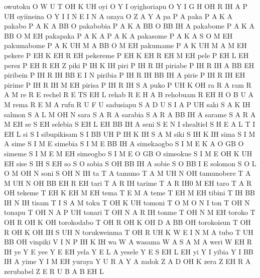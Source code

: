   owutoku O W U T OH K UH
  oyi O Y I
  oyighoriapu O Y I G H OH R IH A P UH
  oyiineina O Y I I N E I N A
  ozaya O Z A Y A
  pa P A
  paka P A K A
  pakabo P A K A BB O
  pakabobia P A K A BB O BB IH A
  pakabome P A K A BB O M EH
  pakapaka P A K A P A K A
  pakasome P A K A S O M EH
  pakumabome P A K UH M A BB O M EH
  pakumame P A K UH M A M EH
  pekere P EH K EH R EH
  pekereme P EH K EH R EH M EH
  pele P EH L EH
  perez P EH R EH Z
  piki P IH K IH
  piri P IH R IH
  piriabe P IH R IH A BB EH
  piribein P IH R IH BB E I N
  piribia P IH R IH BB IH A
  pirie P IH R IH EH
  pirime P IH R IH M EH
  pirisa P IH R IH S A
  puko P UH K OH
  ra R A
  ram R A M
  re R E
  rechel R E TS EH L
  rehab R E H A B
  rehobuam R EH H O B U A M
  rema R E M A
  rufu R U F U
  sadusiapu S A D U S I A P UH
  saki S A K IH
  salmon S A L M OH N
  sara S A R A
  sarabia S A R A BB IH A
  sarame S A R A M EH
  se S EH
  selebia S EH L EH BB IH A
  seni S E N I
  shealtiel S H E A L T I EH L
  si S I
  sibupikisam S I BB UH P IH K IH S A M
  siki S IH K IH
  sima S I M A
  sime S I M E
  simebia S I M E BB IH A
  simekaogbo S I M E K A O GB O
  simeme S I M E M EH
  simeogbo S I M E O GB O
  simeokue S I M E OH K UH EH
  sise S IH S EH
  so S O
  sobia S OH BB IH A
  sobie S O BB I E
  solomon S O L O M OH N
  soni S OH N IH
  ta T A
  tamuno T A M UH N OH
  tamunobere T A M UH N OH BB EH R EH
  tari T A R IH
  tarime T A R IH0 M EH
  taro T A R OH
  tekeme T EH K EH M EH
  tema T E M A
  teme T EH M EH
  tibini T IH BB IH N IH
  tisam T I S A M
  toku T OH K UH
  tomoni T O M O N I
  ton T OH N
  tonapu T OH N A P UH
  tonari T OH N A R IH
  tonme T OH N M EH
  toroko T OH R OH K OH
  torokodabo T OH R OH K OH D A BB OH
  torokoisun T OH R OH K OH IH S UH N
  torukweinma T OH R UH K W E I N M A
  tubo T UH BB OH
  vinpiki V I N P IH K IH
  wa W A
  wasama W A S A M A
  weri W EH R IH
  ye Y E
  yee Y E EH
  yela Y E L A
  yesele Y E S EH L EH
  yi Y I
  yibia Y I BB IH A
  yime Y I M EH
  yuraya Y U R A Y A
  zadok Z A D OH K
  zera Z EH R A
  zerubabel Z E R U B A B EH L